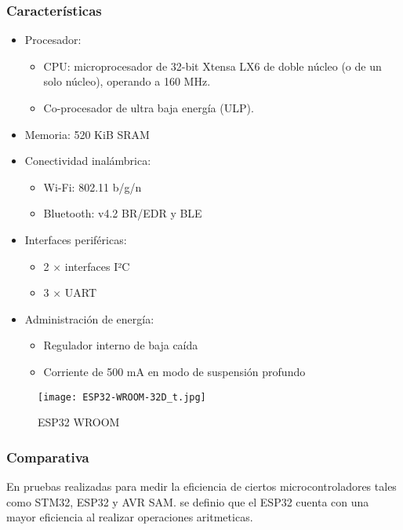 \subsubsection{Características}
\begin{itemize}
    \item Procesador:
          \begin{itemize}
              \item CPU: microprocesador de 32-bit Xtensa LX6 de doble núcleo (o de un solo núcleo), operando a 160 MHz.
              \item Co-procesador de ultra baja energía (ULP).
          \end{itemize}
    \item Memoria: 520 KiB SRAM
    \item Conectividad inalámbrica:
          \begin{itemize}
              \item Wi-Fi: 802.11 b/g/n
              \item Bluetooth: v4.2 BR/EDR y BLE
          \end{itemize}
    \item Interfaces periféricas:
          \begin{itemize}
              \item 2 × interfaces I²C
              \item 3 × UART
          \end{itemize}
    \item Administración de energía:
          \begin{itemize}
              \item Regulador interno de baja caída
              \item Corriente de 500 mA en modo de suspensión profundo
          \end{itemize}
\end{itemize}

\begin{figure}[htp!]
    \centering
    \texttt{[image: ESP32-WROOM-32D\_t.jpg]}
    \caption{ESP32 WROOM}
    \label{fig: esp32}
\end{figure}
\FloatBarrier

\subsubsection{Comparativa}
En pruebas realizadas para medir la eficiencia de ciertos microcontroladores tales como STM32, ESP32 y AVR SAM. se definio que el ESP32 cuenta con una mayor eficiencia al realizar operaciones aritmeticas.

